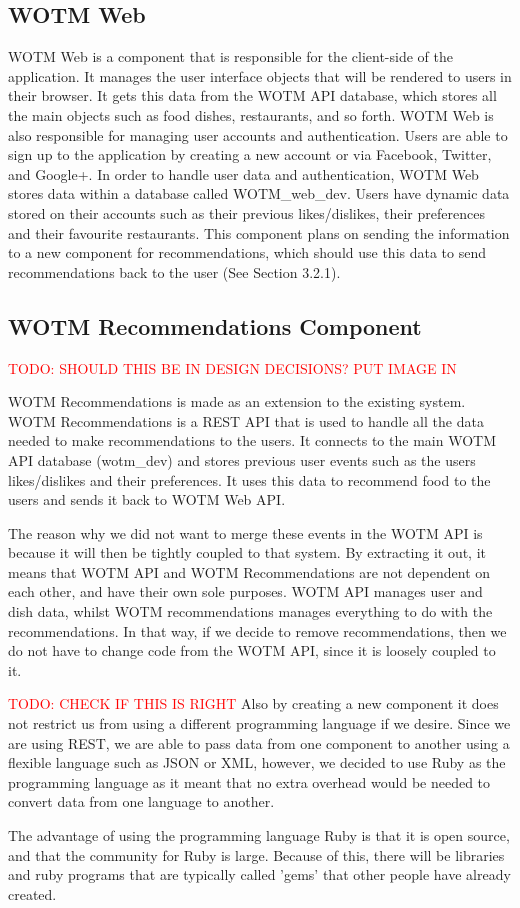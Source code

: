 \subsection{WOTM Web}

WOTM Web is a component that is responsible for the client-side of the application. It manages the user interface objects that will be rendered to users in their browser. It gets this data from the WOTM API database, which stores all the main objects such as food dishes, restaurants, and so forth. WOTM Web is also responsible for managing user accounts and authentication. Users are able to sign up to the application by creating a new account or via Facebook, Twitter, and Google+. In order to handle user data and authentication, WOTM Web stores data within a database called WOTM\_web\_dev. Users have dynamic data stored on their accounts such as their previous likes/dislikes, their preferences and their favourite restaurants. This component plans on sending the information to a new component for recommendations, which should use this data to send recommendations back to the user (See Section 3.2.1). 

\subsection{WOTM Recommendations Component}

\textcolor{red}{TODO: SHOULD THIS BE IN DESIGN DECISIONS? PUT IMAGE IN}

WOTM Recommendations is made as an extension to the existing system. WOTM Recommendations is a REST API that is used to handle all the data needed to make recommendations to the users. It connects to the main WOTM API database (wotm\_dev) and stores previous user events such as the users likes/dislikes and their preferences. It uses this data to recommend food to the users and sends it back to WOTM Web API. 

The reason why we did not want to merge these events in the WOTM API is because it will then be tightly coupled to that system. By extracting it out, it means that WOTM API and WOTM Recommendations are not dependent on each other, and have their own sole purposes. WOTM API manages user and dish data, whilst WOTM recommendations manages everything to do with the recommendations. In that way, if we decide to remove recommendations, then we do not have to change code from the WOTM API, since it is loosely coupled to it. 

\textcolor{red}{TODO: CHECK IF THIS IS RIGHT}
Also by creating a new component it does not restrict us from using a different programming language if we desire. Since we are using REST, we are able to pass data from one component to another using a flexible language such as JSON or XML, however, we decided to use Ruby as the programming language as it meant that no extra overhead would be needed to convert data from one language to another. 

The advantage of using the programming language Ruby is that it is open source, and that the community for Ruby is large. Because of this, there will be libraries and ruby programs that are typically called 'gems' that other people have already created. 
